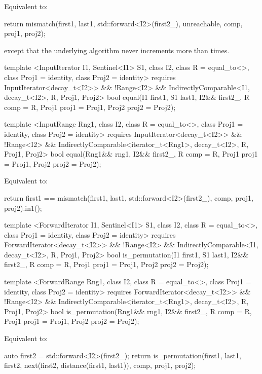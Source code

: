 \pnum
\effects
Equivalent to:
\begin{codeblock}
return mismatch(first1, last1, std::forward<I2>(first2_), unreachable{}, comp, proj1, proj2);
\end{codeblock}
except that the underlying algorithm never increments  more than  times.

\begin{codeblock}
template <InputIterator I1, Sentinel<I1> S1, class I2,
    class R = equal_to<>, class Proj1 = identity, class Proj2 = identity>
  requires InputIterator<decay_t<I2>> && !Range<I2> &&
    IndirectlyComparable<I1, decay_t<I2>, R, Proj1, Proj2>
  bool equal(I1 first1, S1 last1, I2&& first2_, R comp = R{},
             Proj1 proj1 = Proj1{}, Proj2 proj2 = Proj2{});

template <InputRange Rng1, class I2, class R = equal_to<>,
    class Proj1 = identity, class Proj2 = identity>
  requires InputIterator<decay_t<I2>> && !Range<I2> &&
    IndirectlyComparable<iterator_t<Rng1>, decay_t<I2>, R, Proj1, Proj2>
  bool equal(Rng1&& rng1, I2&& first2_, R comp = R{},
             Proj1 proj1 = Proj1{}, Proj2 proj2 = Proj2{});
\end{codeblock}

\pnum
\effects
Equivalent to:
\begin{codeblock}
return first1 == mismatch(first1, last1, std::forward<I2>(first2_), comp, proj1, proj2).in1();
\end{codeblock}

\begin{codeblock}
template <ForwardIterator I1, Sentinel<I1> S1, class I2,
    class R = equal_to<>, class Proj1 = identity, class Proj2 = identity>
  requires ForwardIterator<decay_t<I2>> && !Range<I2> &&
    IndirectlyComparable<I1, decay_t<I2>, R, Proj1, Proj2>
  bool is_permutation(I1 first1, S1 last1, I2&& first2_, R comp = R{},
                      Proj1 proj1 = Proj1{}, Proj2 proj2 = Proj2{});

template <ForwardRange Rng1, class I2, class R = equal_to<>,
    class Proj1 = identity, class Proj2 = identity>
  requires ForwardIterator<decay_t<I2>> && !Range<I2> &&
    IndirectlyComparable<iterator_t<Rng1>, decay_t<I2>, R, Proj1, Proj2>
  bool is_permutation(Rng1&& rng1, I2&& first2_, R comp = R{},
                      Proj1 proj1 = Proj1{}, Proj2 proj2 = Proj2{});
\end{codeblock}

\pnum
\effects
Equivalent to:
\begin{codeblock}
  auto first2 = std::forward<I2>(first2_);
  return is_permutation(first1, last1, first2, next(first2, distance(first1, last1)),
                        comp, proj1, proj2);
\end{codeblock}

